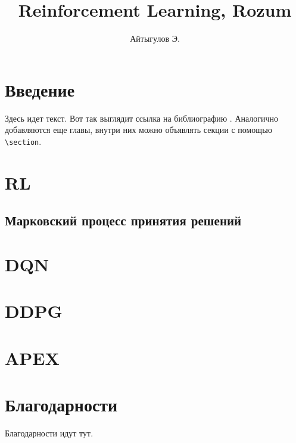 \documentclass{mipt-thesis-bs}
\title{Reinforcement Learning, Rozum}
\author{Айтыгулов Э.}
\begin{document}
\frontmatter
\titlecontents

\mainmatter


\chapter{Введение}

Здесь идет текст. Вот так выглядит ссылка на библиографию \cite{langmuir26}. Аналогично добавляются еще главы, внутри них можно объявлять секции с помощью \verb|\section|.


\chapter{RL}
\section{Марковский процесс принятия решений}


\chapter{DQN}


\chapter{DDPG}


\chapter{APEX}


\backmatter


\chapter{Благодарности}

Благодарности идут тут.
\end{document}
